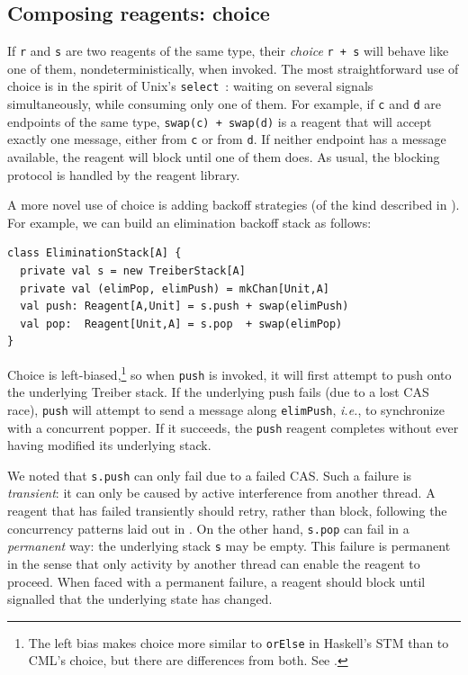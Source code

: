\documentclass[preprint]{sigplanconf}
\begin{document}

\subsection{Composing reagents: choice}
\label{sec:choice}

If \lstinline{r} and \lstinline{s} are two reagents of the same type,
their \emph{choice} \lstinline{r + s} will behave like one of them,
nondeterministically, when invoked.  The most straightforward use of
choice is in the spirit of Unix's \lstinline{select}~\cite{?}: waiting
on several signals simultaneously, while consuming only one of them.
For example, if \lstinline{c} and \lstinline{d} are endpoints of the
same type, \lstinline{swap(c) + swap(d)} is a reagent that will accept
exactly one message, either from \lstinline{c} or from \lstinline{d}.
If neither endpoint has a message available, the reagent will block
until one of them does.  As usual, the blocking protocol is handled by
the reagent library.

A more novel use of choice is adding backoff strategies (of the kind
described in ).  For example, we can build an elimination
backoff stack as follows:
\begin{lstlisting}
class EliminationStack[A] {
  private val s = new TreiberStack[A]
  private val (elimPop, elimPush) = mkChan[Unit,A]
  val push: Reagent[A,Unit] = s.push + swap(elimPush)
  val pop:  Reagent[Unit,A] = s.pop  + swap(elimPop)
}
\end{lstlisting}
Choice is left-biased,\footnote{The left bias makes choice more
  similar to \lstinline{orElse} in Haskell's STM than to CML's choice,
  but there are differences from both.  See .  } so
when \lstinline{push} is invoked, it will first attempt to push onto
the underlying Treiber stack.  If the underlying push fails (due to a
lost CAS race), \lstinline{push} will attempt to send a message along
\lstinline{elimPush}, \emph{i.e.}, to synchronize with a concurrent
popper.  If it succeeds, the \lstinline{push} reagent completes
without ever having modified its underlying stack.

We noted that \lstinline{s.push} can only fail due to a failed CAS.
Such a failure is \emph{transient}: it can only be caused by active
interference from another thread.  A reagent that has failed
transiently should retry, rather than block, following the concurrency
patterns laid out in .  On the other hand,
\lstinline{s.pop} can fail in a \emph{permanent} way: the underlying
stack \lstinline{s} may be empty.  This failure is permanent in the
sense that only activity by another thread can enable the reagent to
proceed.  When faced with a permanent failure, a reagent should block
until signalled that the underlying state has changed.
\end{document}
